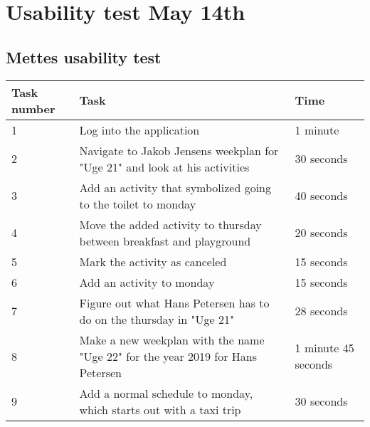 \newpage
\section{Usability test May 14th}\label{usability-test-14-05}
\subsection{Mettes usability test}\label{usability-test-14-05-mette}
\begin{table}[H]
    \small
    \begin{tabular}{|p{1.3cm}|p{10cm}|p{1.7cm}|}
    \hline
    Task number  &Task                                                                                                                & Time      \\ \hline
    1 & Log into the application                                                                                                               & 1 minute  \\ \hline
    2 & Navigate to Jakob Jensens weekplan for "Uge 21" and look at his activities                                                     & 30 seconds  \\ \hline
    3 & Add an activity that symbolized going to the toilet to monday                                                                & 40 seconds               \\ \hline
    4 & Move the added activity to thursday between breakfast and playground                                                          & 20 seconds   \\ \hline
    5 & Mark the activity as canceled                                                                                                & 15 seconds     \\ \hline
    6 & Add an activity to monday                                                                                                     & 15 seconds     \\ \hline
    7 & Figure out what Hans Petersen has to do on the thursday in "Uge 21"                                                       & 28 seconds           \\ \hline
    8 & Make a new weekplan with the name "Uge 22" for the year 2019 for Hans Petersen                                                 & 1 minute 45 seconds        \\ \hline
    9 & Add a normal schedule to monday, which starts out with a taxi trip                                                     & 30 seconds                                                  \\ \hline

\end{tabular}
\end{table}
